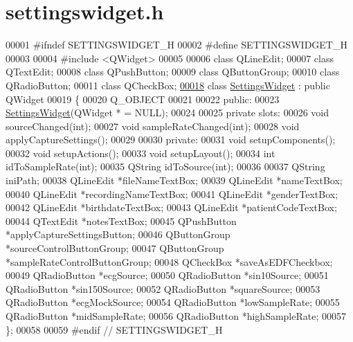 \hypertarget{settingswidget_8h_source}{}\section{settingswidget.\+h}
\label{settingswidget_8h_source}

\begin{DoxyCode}
00001 \textcolor{preprocessor}{#ifndef SETTINGSWIDGET\_H}
00002 \textcolor{preprocessor}{#define SETTINGSWIDGET\_H}
00003 
00004 \textcolor{preprocessor}{#include <QWidget>}
00005 
00006 \textcolor{keyword}{class }QLineEdit;
00007 \textcolor{keyword}{class }QTextEdit;
00008 \textcolor{keyword}{class }QPushButton;
00009 \textcolor{keyword}{class }QButtonGroup;
00010 \textcolor{keyword}{class }QRadioButton;
00011 \textcolor{keyword}{class }QCheckBox;
\hypertarget{settingswidget_8h_source.tex_l00018}{}\hyperlink{classSettingsWidget}{00018} \textcolor{keyword}{class }\hyperlink{classSettingsWidget}{SettingsWidget} : \textcolor{keyword}{public} QWidget
00019 \{
00020     Q\_OBJECT
00021 
00022 \textcolor{keyword}{public}:
00023     \hyperlink{classSettingsWidget_a339891dcba7d2813bc5d894bff494a78}{SettingsWidget}(QWidget * = NULL);
00024 
00025 \textcolor{keyword}{private} slots:
00026     \textcolor{keywordtype}{void} sourceChanged(\textcolor{keywordtype}{int});
00027     \textcolor{keywordtype}{void} sampleRateChanged(\textcolor{keywordtype}{int});
00028     \textcolor{keywordtype}{void} applyCaptureSettings();
00029 
00030 \textcolor{keyword}{private}:
00031     \textcolor{keywordtype}{void} setupComponents();
00032     \textcolor{keywordtype}{void} setupActions();
00033     \textcolor{keywordtype}{void} setupLayout();
00034     \textcolor{keywordtype}{int} idToSampleRate(\textcolor{keywordtype}{int});
00035     QString idToSource(\textcolor{keywordtype}{int});
00036 
00037     QString iniPath;
00038     QLineEdit *fileNameTextBox;
00039     QLineEdit *nameTextBox;
00040     QLineEdit *recordingNameTextBox;
00041     QLineEdit *genderTextBox;
00042     QLineEdit *birthdateTextBox;
00043     QLineEdit *patientCodeTextBox;
00044     QTextEdit *notesTextBox;
00045     QPushButton *applyCaptureSettingsButton;
00046     QButtonGroup *sourceControlButtonGroup;
00047     QButtonGroup *sampleRateControlButtonGroup;
00048     QCheckBox *saveAsEDFCheckbox;
00049     QRadioButton *ecgSource;
00050     QRadioButton *sin10Source;
00051     QRadioButton *sin150Source;
00052     QRadioButton *squareSource;
00053     QRadioButton *ecgMockSource;
00054     QRadioButton *lowSampleRate;
00055     QRadioButton *midSampleRate;
00056     QRadioButton *highSampleRate;
00057 \};
00058 
00059 \textcolor{preprocessor}{#endif // SETTINGSWIDGET\_H}
\end{DoxyCode}
